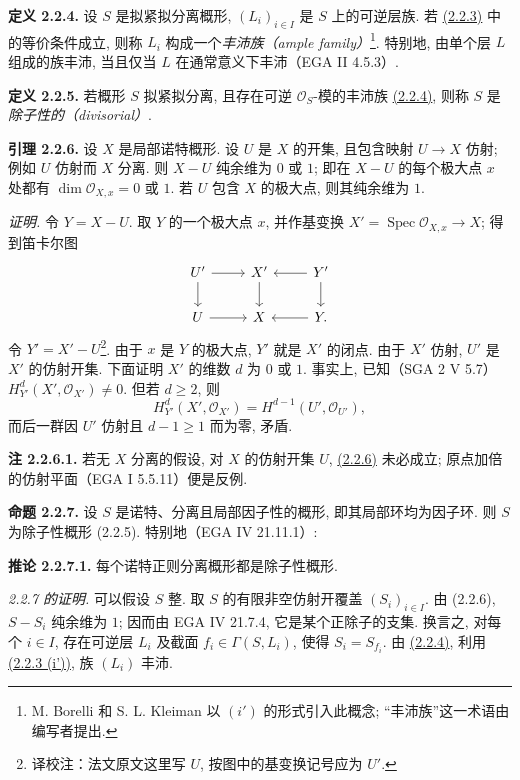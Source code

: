 \textbf{定义 2.2.4.} 设 $S$ 是拟紧拟分离概形, $(L_i)_{i\in I}$ 是 $S$ 上的可逆层族. 若 \hyperlink{sga6.e02.prop.2-2-3}{(2.2.3)} 中的等价条件成立, 则称 $L_i$ 构成一个\emph{丰沛族（ample family）}\footnote{M. Borelli 和 S. L. Kleiman 以 $(i\prime)$ 的形式引入此概念; “丰沛族”这一术语由编写者提出.}. 特别地, 由单个层 $L$ 组成的族丰沛, 当且仅当 $L$ 在通常意义下丰沛（EGA II 4.5.3）.

\textbf{定义 2.2.5.} 若概形 $S$ 拟紧拟分离, 且存在可逆 $\mathcal O_S$-模的丰沛族 \hyperlink{sga6.e02.def.2-2-4}{(2.2.4)}, 则称 $S$ 是\emph{除子性的（divisorial）}.

\textbf{引理 2.2.6.} 设 $X$ 是局部诺特概形. 设 $U$ 是 $X$ 的开集, 且包含映射 $U\to X$ 仿射; 例如 $U$ 仿射而 $X$ 分离. 则 $X-U$ 纯余维为 $0$ 或 $1$; 即在 $X-U$ 的每个极大点 $x$ 处都有 $\dim\mathcal O_{X,x}=0$ 或 $1$. 若 $U$ 包含 $X$ 的极大点, 则其纯余维为 $1$.

\emph{证明.} 令 $Y=X-U$. 取 $Y$ 的一个极大点 $x$, 并作基变换 $X'=\operatorname{Spec}\mathcal O_{X,x}\to X$; 得到笛卡尔图
\[
\begin{tikzcd}
U' \arrow[r] \arrow[d] & X' \arrow[d] & Y' \arrow[l] \arrow[d] \\
U \arrow[r] & X & Y \arrow[l].
\end{tikzcd}
\]
令 $Y'=X'-U$\footnote{译校注：法文原文这里写 $U$, 按图中的基变换记号应为 $U'$.}. 由于 $x$ 是 $Y$ 的极大点, $Y'$ 就是 $X'$ 的闭点. 由于 $X'$ 仿射, $U'$ 是 $X'$ 的仿射开集. 下面证明 $X'$ 的维数 $d$ 为 $0$ 或 $1$. 事实上, 已知（SGA 2 V 5.7）$H^d_{Y'}(X',\mathcal O_{X'})\ne0$. 但若 $d\ge2$, 则
\[
H^d_{Y'}(X',\mathcal O_{X'})=H^{d-1}(U',\mathcal O_{U'}),
\]
而后一群因 $U'$ 仿射且 $d-1\ge1$ 而为零, 矛盾.

\textbf{注 2.2.6.1.} 若无 $X$ 分离的假设, 对 $X$ 的仿射开集 $U$, \hyperlink{sga6.e02.lem.2-2-6}{(2.2.6)} 未必成立; 原点加倍的仿射平面（EGA I 5.5.11）便是反例.

\textbf{命题 2.2.7.} 设 $S$ 是诺特、分离且局部因子性的概形, 即其局部环均为因子环. 则 $S$ 为除子性概形 (2.2.5). 特别地（EGA IV 21.11.1）:

\textbf{推论 2.2.7.1.} 每个诺特正则分离概形都是除子性概形.

\emph{2.2.7 的证明.} 可以假设 $S$ 整. 取 $S$ 的有限非空仿射开覆盖 $(S_i)_{i\in I}$. 由 (2.2.6), $S-S_i$ 纯余维为 $1$; 因而由 EGA IV 21.7.4, 它是某个正除子的支集. 换言之, 对每个 $i\in I$, 存在可逆层 $L_i$ 及截面 $f_i\in\Gamma(S,L_i)$, 使得 $S_i=S_{f_i}$. 由 \hyperlink{sga6.e02.def.2-2-4}{(2.2.4)}, 利用 \hyperlink{sga6.e02.prop.2-2-3}{(2.2.3 (i'))}, 族 $(L_i)$ 丰沛.

